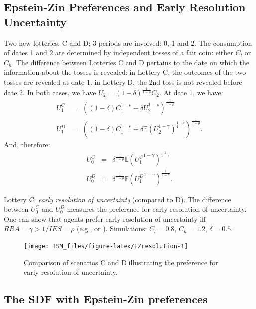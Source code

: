 \documentclass[
  12pt,
]{book}
\theoremstyle{definition}
\theoremstyle{definition}
\theoremstyle{definition}
\theoremstyle{definition}
\theoremstyle{remark}
\begin{document}
\hypertarget{epstein-zin-preferences-and-early-resolution-uncertainty}{%
\subsection{Epstein-Zin Preferences and Early Resolution Uncertainty}\label{epstein-zin-preferences-and-early-resolution-uncertainty}}

Two new lotteries: C and D; 3 periods are involved: 0, 1 and 2.
The consumption of dates 1 and 2 are determined by independent tosses of a fair coin: either \(C_l\) or \(C_h\).
The difference between Lotteries C and D pertains to the date on which the information about the tosses is revealed: in Lottery C, the outcomes of the two tosses are revealed at date 1. in Lottery D, the \(2\)nd toss is not revealed before date \(2\).
In both cases, we have \(U_2 = (1-\delta)^{\frac{1}{1-\rho}}C_{2}\).
At date 1, we have:
\begin{eqnarray*}
U_1^C &=& \left((1-\delta)C_1^{1-\rho} + \delta U_2^{1-\rho}\right)^{\frac{1}{1-\rho}}\\
U_1^D &=& \left((1-\delta)C_1^{1-\rho} + \delta \mathbb{E}(U_2^{1-\gamma})^{\frac{1-\rho}{1-\gamma}}\right)^{\frac{1}{1-\rho}}.
\end{eqnarray*}
And, therefore:
\begin{eqnarray*}
U_0^C &=& \delta^{\frac{1}{1-\rho}} \mathbb{E}({U_1^C}^{1-\gamma})^{\frac{1}{1-\gamma}}\\
U_0^D &=& \delta^{\frac{1}{1-\rho}} \mathbb{E}({U_1^D}^{1-\gamma})^{\frac{1}{1-\gamma}}.
\end{eqnarray*}

Lottery C: \emph{early resolution of uncertainty} (compared to D).
The difference between \(U_0^C\) and \(U_0^D\) measures the preference for early resolution of uncertainty.
One can show that agents prefer early resolution of uncertainty iff \(RRA = \gamma > 1/IES = \rho\) (e.g., \citet{Epstein_Fahri_Strzalecki_2014} or \citet{Duffie_Epstein_1992}).
Simulations: \(C_l = 0.8\), \(C_h = 1.2\), \(\delta = 0.5\).

\begin{figure}
\texttt{[image: TSM\_files/figure-latex/EZresolution-1]} \caption{Comparison of scenarios C and D illustrating the preference for early resolution of uncertainty.}\label{fig:EZresolution}
\end{figure}

\hypertarget{the-sdf-with-epstein-zin-preferences}{%
\subsection{The SDF with Epstein-Zin preferences}\label{the-sdf-with-epstein-zin-preferences}}
\end{document}
